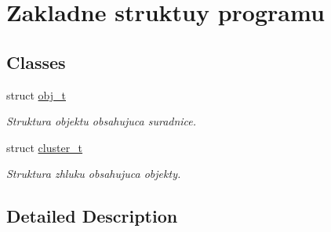 \hypertarget{group__struct}{}\section{Zakladne struktuy programu}
\label{group__struct}
\subsection*{Classes}
\begin{DoxyCompactItemize}
\item 
struct \hyperlink{structobj__t}{obj\+\_\+t}
\begin{DoxyCompactList}\small\item\em Struktura objektu obsahujuca suradnice. \end{DoxyCompactList}\item 
struct \hyperlink{structcluster__t}{cluster\+\_\+t}
\begin{DoxyCompactList}\small\item\em Struktura zhluku obsahujuca objekty. \end{DoxyCompactList}\end{DoxyCompactItemize}


\subsection{Detailed Description}

